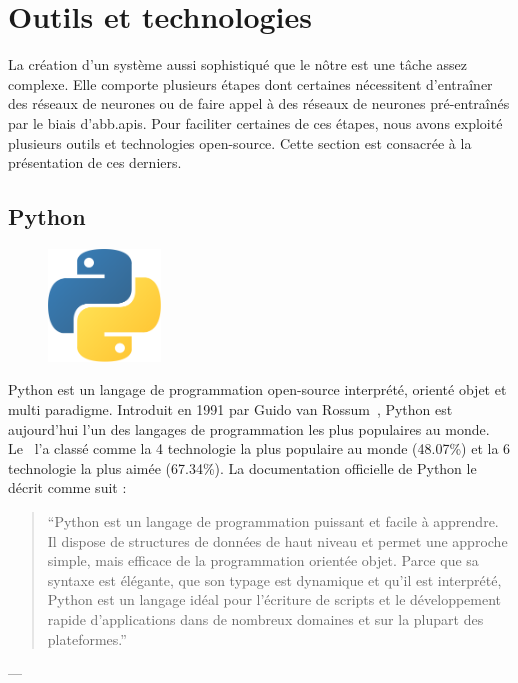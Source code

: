 \section{Outils et technologies}%
\label{sec.tech}

La création d'un système aussi sophistiqué que le nôtre est une tâche assez complexe.
Elle comporte plusieurs étapes dont certaines nécessitent d'entraîner des réseaux de neurones 
ou de faire appel à des réseaux de neurones pré-entraînés par le biais d'\glspl{abb.api}.
Pour faciliter certaines de ces étapes, nous avons exploité plusieurs outils et technologies open-source.
Cette section est consacrée à la présentation de ces derniers.

\subsection{Python}%
\label{subsec.python}

\begin{figure}
    \vspace*{-\topsep}
    \centering
    \includegraphics[width=3cm]{assets/images/python-logo.png}
\end{figure}
Python est un langage de programmation open-source interprété, orienté objet et multi paradigme.
Introduit en 1991 par Guido van Rossum~\cite{Python_2022},
Python est aujourd'hui l'un des langages de programmation les plus populaires au monde.
Le~\cite{StackOverflowSurvey2022} l'a classé comme la 4\ieme{} technologie la plus populaire au monde (48.07\%)
et la 6\ieme{} technologie la plus aimée (67.34\%).
La documentation officielle de Python le décrit comme suit :

\begin{quote}
    ``Python est un langage de programmation puissant et facile à apprendre. 
    Il dispose de structures de données de haut niveau 
    et permet une approche simple, mais efficace de la programmation orientée objet. 
    Parce que sa syntaxe est élégante, que son typage est dynamique et qu'il est interprété, 
    Python est un langage idéal pour l'écriture de scripts 
    et le développement rapide d'applications dans de nombreux domaines et sur la plupart des plateformes.''
\end{quote}
\begin{flushright}
    --- 
\end{flushright}

